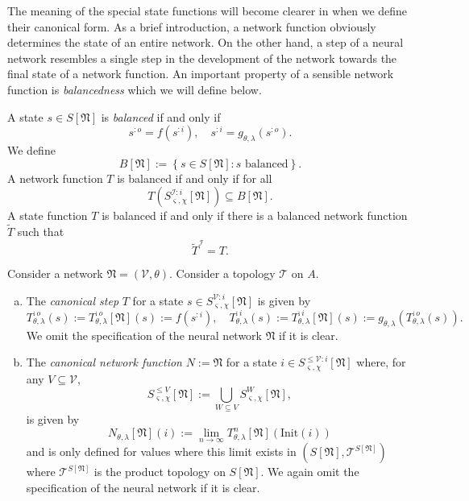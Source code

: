 \documentclass[a4paper,11pt]{report}
\newcommand{\const}{\varsigma} %
\newcommand{\var}{\chi} %
\newcommand{\In}{\text{Init}}
\begin{document}
\begin{Par}
The meaning of the special state functions will become clearer in  when we define their canonical form. As a brief introduction, a network function obviously determines the state of an entire network. On the other hand, a step of a neural network resembles a single step in the development of the network towards the final state of a network function. An important property of a sensible network function is \emph{balancedness} which we will define below.
\end{Par}

\begin{Def}[Balancedness]\label{def:balancedness}
A state $s\in S[\mathfrak{N}]$ is \emph{balanced} if and only if 
\begin{equation}\label{eq:balancedness}
s^{:o}=f(s^{:i}),
\quad
s^{:i}=g_{\theta,\lambda}(s^{:o}).
\end{equation}
We define
\[
B[\mathfrak{N}]:=\left\{s\in S[\mathfrak{N}]:s\text{ balanced}\right\}.
\]
A network function $T$ is balanced if and only if for all 
\[
T\left(S^{\mathcal{I}:i}_{\const,\var}[\mathfrak{N}]\right)\subseteq B[\mathfrak{N}].
\]
A state function $T$ is balanced if and only if there is a balanced network function $\tilde{T}$ such that
\[
\tilde{T}^{\mathcal{I}}=T.
\]
\end{Def}

\begin{Def}\label{def:canonical-state-functions}
Consider a network $\mathfrak{N}=(\mathcal{V},\theta)$. Consider a topology $\mathcal{T}$ on $A$.
\begin{enumerate}[a)]
\item
The \emph{canonical step} $T$ for a state $s\in S^{\mathcal{V}:i}_{\const,\var}[\mathfrak{N}]$ is given by
\begin{equation}\label{eq:canonical-step}
T_{\theta,\lambda}^{:o}(s):=T_{\theta,\lambda}^{:o}[\mathfrak{N}](s):=f\left(s^{:i}\right),
\quad
T_{\theta,\lambda}^{:i}(s):=T_{\theta,\lambda}^{:i}[\mathfrak{N}](s):=g_{\theta,\lambda}\left(T_{\theta,\lambda}^{:o}(s)\right).
\end{equation}
We omit the specification of the neural network $\mathfrak{N}$ if it is clear.
\item
The \emph{canonical network function} $N:=\mathfrak{N}$ for a state $i\in S^{\le\mathcal{V}:i}_{\const,\var}[\mathfrak{N}]$ where, for any $V\subseteq\mathcal{V}$, 
\[
S^{\le V}_{\const,\var}[\mathfrak{N}]:=\bigcup_{W\subseteq V}S^W_{\const,\var}[\mathfrak{N}],
\]
is given by
\begin{equation}
N_{\theta,\lambda}[\mathfrak{N}](i):=\lim_{n\to\infty}T_{\theta,\lambda}^n[\mathfrak{N}](\In(i))
\end{equation}
and is only defined for values where this limit exists in $(S[\mathfrak{N}],\mathcal{T}^{S[\mathfrak{N}]})$ where $\mathcal{T}^{S[\mathfrak{N}]}$ is the product topology on $S[\mathfrak{N}]$. We again omit the specification of the neural network if it is clear.
\end{enumerate}
\end{Def}
\end{document}
